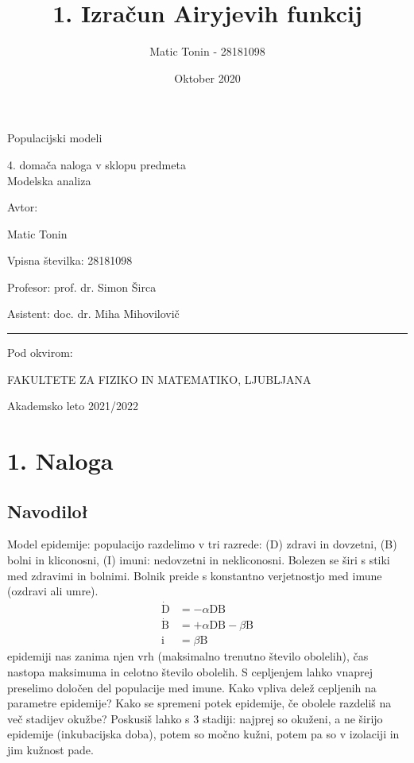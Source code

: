 \documentclass[slovene,11pt,a4paper]{article}
\title{1. Izračun Airyjevih funkcij}
\author{Matic Tonin - 28181098 }
\date{Oktober 2020}
\begin{document}
\begin{center}
\thispagestyle{empty}
\parskip=14pt%
\vspace*{3\parskip}%
\begin{Huge}Populacijski modeli\end{Huge}


4. domača naloga v sklopu predmeta \\
Modelska analiza

Avtor:

Matic Tonin

Vpisna številka: 28181098

Profesor: prof. dr. Simon Širca

Asistent: doc. dr. Miha Mihovilovič


\rule{7cm}{0.4pt}

Pod okvirom:

FAKULTETE ZA FIZIKO IN MATEMATIKO, LJUBLJANA

Akademsko leto 2021/2022


\end{center}
\pagebreak
\section{1. Naloga}
\subsection{Navodiloł}
Model epidemije: populacijo razdelimo v tri razrede: (D) zdravi in dovzetni, (B) bolni in
kliconosni, (I) imuni: nedovzetni in nekliconosni. Bolezen se širi s stiki med zdravimi in bolnimi.
Bolnik preide s konstantno verjetnostjo med imune (ozdravi ali umre).
\begin{equation}
\begin{aligned}
\dot{\mathrm{D}} &=-\alpha \mathrm{DB} \\
\dot{\mathrm{B}} &=+\alpha \mathrm{DB}-\beta \mathrm{B} \\
\mathrm{i} &=\beta \mathrm{B}
\end{aligned}
\end{equation}
epidemiji nas zanima njen vrh (maksimalno trenutno število obolelih), čas nastopa maksimuma
in celotno število obolelih. S cepljenjem lahko vnaprej preselimo določen del populacije med
imune. Kako vpliva delež cepljenih na parametre epidemije?
Kako se spremeni potek epidemije, če obolele razdeliš na več stadijev okužbe? Poskusiš lahko s
3 stadiji: najprej so okuženi, a ne širijo epidemije (inkubacijska doba), potem so močno kužni,
potem pa so v izolaciji in jim kužnost pade.
\end{document}
